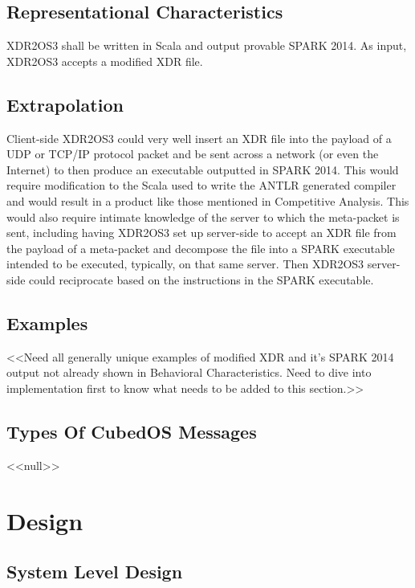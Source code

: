 \subsection{Representational Characteristics}

XDR2OS3 shall be written in Scala and output provable SPARK 2014. As input, XDR2OS3 accepts a
modified XDR file.

\subsection{Extrapolation}

Client-side XDR2OS3 could very well insert an XDR file into the payload of a UDP or TCP/IP
protocol packet and be sent across a network (or even the Internet) to then produce an
executable outputted in SPARK 2014. This would require modification to the Scala used to write
the ANTLR generated compiler and would result in a product like those mentioned in Competitive
Analysis. This would also require intimate knowledge of the server to which the meta-packet is
sent, including having XDR2OS3 set up server-side to accept an XDR file from the payload of a
meta-packet and decompose the file into a SPARK executable intended to be executed, typically,
on that same server. Then XDR2OS3 server-side could reciprocate based on the instructions in the
SPARK executable.

\subsection{Examples}

<<Need all generally unique examples of modified XDR and it’s SPARK 2014 output not already
shown in Behavioral Characteristics. Need to dive into implementation first to know what needs
to be added to this section.>>

\subsection{Types Of CubedOS Messages}

<<null>>
	
\section{Design}

\subsection{System Level Design}

